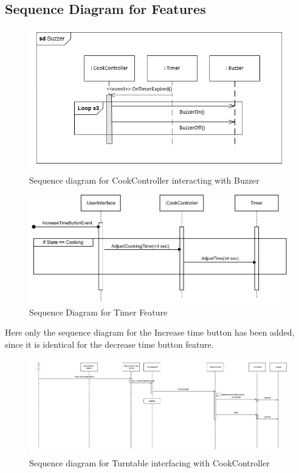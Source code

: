 \subsection{Sequence Diagram for Features}
\begin{figure}[h]
  \centering
  \includegraphics[scale=0.6]{02-Body/Image/BuzzerSEQ.PNG}
  \caption{Sequence diagram for CookController interacting with Buzzer}%
  \label{fig:BuzzerSeq}
\end{figure}

\begin{figure}[h]
  \centering
  \includegraphics[scale=0.8]{02-Body/Image/TimerFeatureSEQ.pdf}
  \caption{Sequence Diagram for Timer Feature}%
  \label{fig:timeFeature}
\end{figure}

Here only the sequence diagram for the Increase time button has been added, since it
is identical for the decrease time button feature.

\begin{figure}[h]
  \centering
  \includegraphics[scale=0.6]{02-Body/Image/TurntableSeq.PNG}
  \caption{Sequence diagram for Turntable interfacing with CookController}%
  \label{fig:TurntableSeq}
\end{figure}

\newpage
